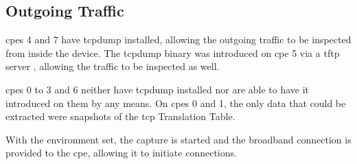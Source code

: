 \subsection{Outgoing Traffic}

\glspl{cpe} 4 and 7 have tcpdump \cite{tcpdump} installed, allowing the outgoing traffic to be inspected from inside the device. The tcpdump binary was introduced on \gls{cpe} 5 via a \gls{tftp} server \cite{rfc1350}, allowing the traffic to be inspected as well.

\glspl{cpe} 0 to 3 and 6 neither have tcpdump installed nor are able to have it introduced on them by any means. On \glspl{cpe} 0 and 1, the only data that could be extracted were snapshots of the \gls{tcp} Translation Table.

With the environment set, the capture is started and the broadband connection is provided to the \gls{cpe}, allowing it to initiate connections.




